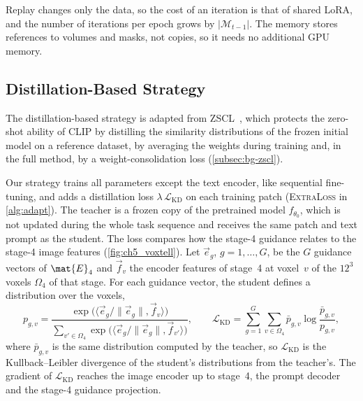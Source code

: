 Replay changes only the data, so the cost of an iteration is that of shared LoRA, and the number of iterations per epoch grows by $|\mathcal{M}_{t-1}|$.
The memory stores references to volumes and masks, not copies, so it needs no additional GPU memory.

\subsection{Distillation-Based Strategy}
\label{subsec:method-distillation}

The distillation-based strategy is adapted from ZSCL~\cite{zheng2023preventingzeroshottransferdegradation}, which protects the zero-shot ability of CLIP by distilling the similarity distributions of the frozen initial model on a reference dataset, by averaging the weights during training and, in the full method, by a weight-consolidation loss (\cref{subsec:bg-zscl}).

Our strategy trains all parameters except the text encoder, like sequential fine-tuning, and adds a distillation loss $\lambda\,\mathcal{L}_{\mathrm{KD}}$ on each training patch (\textsc{ExtraLoss} in \cref{alg:adapt}).
The teacher is a frozen copy of the pretrained model $f_{\theta_0}$, which is not updated during the whole task sequence and receives the same patch and text prompt as the student.
The loss compares how the stage-4 guidance relates to the stage-4 image features (\cref{fig:ch5_voxtell}).
Let $\vec{e}_g$, $g = 1, \dots, G$, be the $G$ guidance vectors of $\mat{E}_4$ and $\vec{f}_v$ the encoder features of stage~4 at voxel~$v$ of the $12^3$ voxels $\Omega_4$ of that stage.
For each guidance vector, the student defines a distribution over the voxels,
\begin{equation}
p_{g,v} = \frac{\exp\big(\langle \vec{e}_g / \|\vec{e}_g\|, \vec{f}_v \rangle\big)}{\sum_{v' \in \Omega_4} \exp\big(\langle \vec{e}_g / \|\vec{e}_g\|, \vec{f}_{v'} \rangle\big)},
\qquad
\mathcal{L}_{\mathrm{KD}} = \sum_{g=1}^{G} \sum_{v \in \Omega_4} \bar{p}_{g,v} \log \frac{\bar{p}_{g,v}}{p_{g,v}},
\label{eq:method-kd}
\end{equation}
where $\bar{p}_{g,v}$ is the same distribution computed by the teacher, so $\mathcal{L}_{\mathrm{KD}}$ is the Kullback--Leibler divergence of the student's distributions from the teacher's.
The gradient of $\mathcal{L}_{\mathrm{KD}}$ reaches the image encoder up to stage~4, the prompt decoder and the stage-4 guidance projection.

